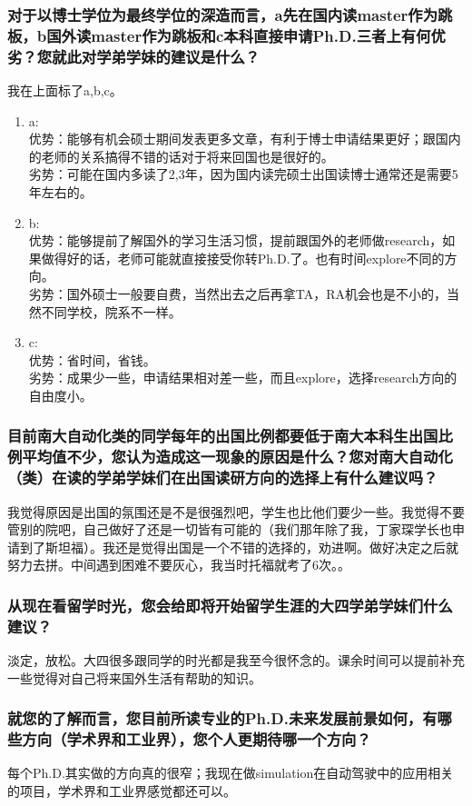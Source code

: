 \documentclass[a4paper,UTF8]{book}
\begin{document}
    \subsubsection*{对于以博士学位为最终学位的深造而言，a先在国内读master作为跳板，b国外读master作为跳板和c本科直接申请Ph.D.三者上有何优劣？您就此对学弟学妹的建议是什么？}
        我在上面标了a,b,c。
        \begin{enumerate}[itemindent=0pt,itemsep=0pt,parsep=0pt]
        \item a:\\
        优势：能够有机会硕士期间发表更多文章，有利于博士申请结果更好；跟国内的老师的关系搞得不错的话对于将来回国也是很好的。\\
        劣势：可能在国内多读了2,3年，因为国内读完硕士出国读博士通常还是需要5年左右的。
        \item b:\\
        优势：能够提前了解国外的学习生活习惯，提前跟国外的老师做research，如果做得好的话，老师可能就直接接受你转Ph.D.了。也有时间explore不同的方向。\\
        劣势：国外硕士一般要自费，当然出去之后再拿TA，RA机会也是不小的，当然不同学校，院系不一样。
        \item c:\\
        优势：省时间，省钱。\\
        劣势：成果少一些，申请结果相对差一些，而且explore，选择research方向的自由度小。
        \end{enumerate}
    \subsubsection*{目前南大自动化类的同学每年的出国比例都要低于南大本科生出国比例平均值不少，您认为造成这一现象的原因是什么？您对南大自动化（类）在读的学弟学妹们在出国读研方向的选择上有什么建议吗？}
    我觉得原因是出国的氛围还是不是很强烈吧，学生也比他们要少一些。我觉得不要管别的院吧，自己做好了还是一切皆有可能的（我们那年除了我，丁家琛学长也申请到了斯坦福）。我还是觉得出国是一个不错的选择的，劝进啊。做好决定之后就努力去拼。中间遇到困难不要灰心，我当时托福就考了6次。。
    \subsubsection*{从现在看留学时光，您会给即将开始留学生涯的大四学弟学妹们什么建议？}
    淡定，放松。大四很多跟同学的时光都是我至今很怀念的。课余时间可以提前补充 一些觉得对自己将来国外生活有帮助的知识。
    \subsubsection*{就您的了解而言，您目前所读专业的Ph.D.未来发展前景如何，有哪些方向（学术界和工业界），您个人更期待哪一个方向？}
    每个Ph.D.其实做的方向真的很窄；我现在做simulation在自动驾驶中的应用相关的项目，学术界和工业界感觉都还可以。
\end{document}
